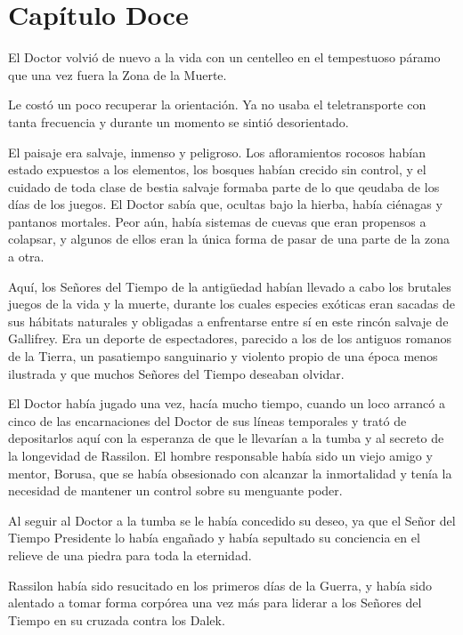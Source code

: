 \chapter*{Capítulo Doce}




El Doctor volvió de nuevo a la vida con un centelleo en el tempestuoso páramo que una vez fuera la Zona de la Muerte. 

Le costó un poco recuperar la orientación. Ya no usaba el teletransporte con tanta frecuencia y durante un momento se sintió desorientado. 

El paisaje era salvaje, inmenso y peligroso. Los afloramientos rocosos habían estado expuestos a los elementos, los bosques habían crecido sin control, y el cuidado de toda clase de bestia salvaje formaba parte de lo que qeudaba de los días de los juegos. El Doctor sabía que, ocultas bajo la hierba, había ciénagas y pantanos mortales. Peor aún, había sistemas de cuevas que eran propensos a colapsar, y algunos de ellos eran la única forma de pasar de una parte de la zona a otra. 

Aquí, los Señores del Tiempo de la antigüedad habían llevado a cabo los brutales juegos de la vida y la muerte, durante los cuales especies exóticas eran sacadas de sus hábitats naturales y obligadas a enfrentarse entre sí en este rincón salvaje de Gallifrey. Era un deporte de espectadores, parecido a los de los antiguos romanos de la Tierra, un pasatiempo sanguinario y violento propio de una época menos ilustrada y que muchos Señores del Tiempo deseaban olvidar. 

El Doctor había jugado una vez, hacía mucho tiempo, cuando un loco arrancó a cinco de las encarnaciones del Doctor de sus líneas temporales y trató de depositarlos aquí con la esperanza de que le llevarían a la tumba y al secreto de la longevidad de Rassilon. El hombre responsable había sido un viejo amigo y mentor, Borusa, que se había obsesionado con alcanzar la inmortalidad y tenía la necesidad de mantener un control sobre su menguante poder. 

Al seguir al Doctor a la tumba se le había concedido su deseo, ya que el Señor del Tiempo Presidente lo había engañado y había sepultado su conciencia en el relieve de una piedra para toda la eternidad. 

Rassilon había sido resucitado en los primeros días de la Guerra, y había sido alentado a tomar forma corpórea una vez más para liderar a los Señores del Tiempo en su cruzada contra los Dalek.

